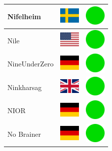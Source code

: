 \documentclass[12pt, a4paper, twoside]{report}
\begin{document}
\begin{center}
\begin{longtable}{|p{5cm}|p{2cm}|p{2cm}|}
 Nifelheim                                                  & \includegraphics[width=1cm]{../img/flags/se} &   \includegraphics[width=1cm]{../likes/y} \\ \hline
 Nile                                                       & \includegraphics[width=1cm]{../img/flags/us} &   \includegraphics[width=1cm]{../likes/y} \\ \hline
 NineUnderZero                                              & \includegraphics[width=1cm]{../img/flags/de} &   \includegraphics[width=1cm]{../likes/y} \\ \hline
 Ninkharsag                                                 & \includegraphics[width=1cm]{../img/flags/gb} &   \includegraphics[width=1cm]{../likes/y} \\ \hline
 NIOR                                                       & \includegraphics[width=1cm]{../img/flags/de} &   \includegraphics[width=1cm]{../likes/y} \\ \hline
 No Brainer                                                 & \includegraphics[width=1cm]{../img/flags/de} &   \includegraphics[width=1cm]{../likes/y} \\ \hline

\end{longtable}
\end{center}
\end{document}
